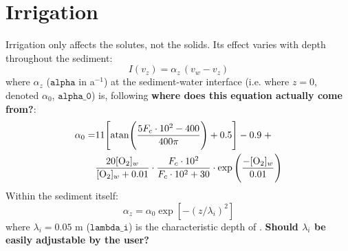\documentclass[a4paper]{article}
\newcommand{\code}[1]{\texttt{#1}}
\newcommand{\wtf}[1]{\textcolor{Cerulean}{\textbf{#1}}}
\begin{document}

\section{Irrigation}\label{sx:irrigation}

Irrigation only affects the solutes, not the solids. Its effect varies with depth throughout the sediment:
\begin{equation}
I(v_z) = \alpha_z \, (v_w - v_z)
\end{equation}
where $\alpha_z$ ($\code{alpha}$ in a$^{-1}$) at the sediment-water interface (i.e. where $z = 0$, denoted $\alpha_0$, $\code{alpha\_0}$) is, following \wtf{where does this equation actually come from?}:
\begin{equation}
\begin{split}
\alpha_0 = & 11 \Bigg[ \mathrm{atan} \Bigg( \frac{5 F_c \cdot 10^2 - 400}{400 \pi} \Bigg) + 0.5 \Bigg] - 0.9 \; + \\
& \frac{20 [\ce{O2}]_w}{[\ce{O2}]_w + 0.01} \cdot \frac{F_c \cdot 10^2}{F_c \cdot 10^2 + 30} \cdot \exp \Bigg(\frac{-[\ce{O2}]_w}{0.01}\Bigg)
\end{split}
\end{equation}
Within the sediment itself:
\begin{equation}
\alpha_z = \alpha_0 \exp [-(z/\lambda_i)^2]
\end{equation}
where $\lambda_i = 0.05$ m ($\code{lambda\_i}$) is the characteristic depth of \citet{archer_model_2002}. \wtf{Should $\lambda_i$ be easily adjustable by the user?}


\end{document}
